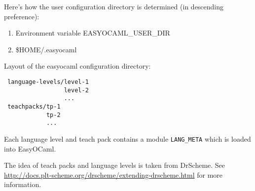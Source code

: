 Here's how the user configuration directory is determined (in descending 
preference):

\begin{enumerate}
    \item Environment variable EASYOCAML\_USER\_DIR
    \item \$HOME/.easyocaml
\end{enumerate}

Layout of the easyocaml configuration directory:

\begin{verbatim}
 language-levels/level-1
                 level-2
                 ...
 teachpacks/tp-1
            tp-2
            ...
\end{verbatim}

Each language level and teach pack contains a module \texttt{LANG\_META} 
which is loaded into EasyOCaml.

The idea of teach packs and language levels is taken from DrScheme.  See 
\href{http://docs.plt-scheme.org/drscheme/extending-drscheme.html}{http://docs.plt-scheme.org/drscheme/extending-drscheme.html}
for more information.

\label{endpart1}


